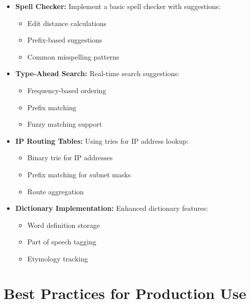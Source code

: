 \begin{itemize}
    \item \textbf{Spell Checker:} Implement a basic spell checker with suggestions:
    \begin{itemize}
        \item Edit distance calculations
        \item Prefix-based suggestions
        \item Common misspelling patterns
    \end{itemize}

    \item \textbf{Type-Ahead Search:} Real-time search suggestions:
    \begin{itemize}
        \item Frequency-based ordering
        \item Prefix matching
        \item Fuzzy matching support
    \end{itemize}

    \item \textbf{IP Routing Tables:} Using tries for IP address lookup:
    \begin{itemize}
        \item Binary trie for IP addresses
        \item Prefix matching for subnet masks
        \item Route aggregation
    \end{itemize}

    \item \textbf{Dictionary Implementation:} Enhanced dictionary features:
    \begin{itemize}
        \item Word definition storage
        \item Part of speech tagging
        \item Etymology tracking
    \end{itemize}
\end{itemize}

\section*{Best Practices for Production Use}

